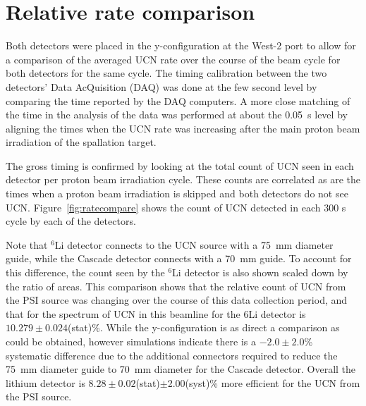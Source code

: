 \documentclass[review]{elsarticle}
\begin{document}


\section{ Relative rate comparison }\label{sec:relative}

Both detectors were placed in the y-configuration at the West-2 port
to allow for a comparison of the averaged UCN rate over the course of
the beam cycle for both detectors for the same cycle.  The timing
calibration between the two detectors' Data AcQuisition (DAQ) was done
at the few second level by comparing the time reported by the DAQ
computers.  A more close matching of the time in the analysis of the
data was performed at about the 0.05~s level by aligning the times
when the UCN rate was increasing after the main proton beam
irradiation of the spallation target.

The gross timing is confirmed by looking at the total count of UCN
seen in each detector per proton beam irradiation cycle.  These counts
are correlated as are the times when a proton beam irradiation is
skipped and both detectors do not see UCN.
Figure~\ref{fig:ratecompare} shows the count of UCN detected in each
300 s cycle by each of the detectors.

Note that $^{6}$Li detector connects to the UCN source with a 75~mm
diameter guide, while the Cascade detector connects with a 70~mm
guide.  To account for this difference, the count seen by the $^{6}$Li
detector is also shown scaled down by the ratio of areas.  This
comparison shows that the relative count of UCN from the PSI source
was changing over the course of this data collection period, and that
for the spectrum of UCN in this beamline for the ${6}$Li detector is
$10.279 \pm 0.024$(stat)\%.  While the y-configuration is as direct a
comparison as could be obtained, however simulations indicate there is
a $-2.0\pm2.0$\% systematic difference due to the additional
connectors required to reduce the 75~mm diameter guide to 70~mm
diameter for the Cascade detector.  Overall the lithium detector is
$8.28\pm0.02$(stat)$\pm$2.00(syst)\% more efficient for the UCN from
the PSI source.
\end{document}
